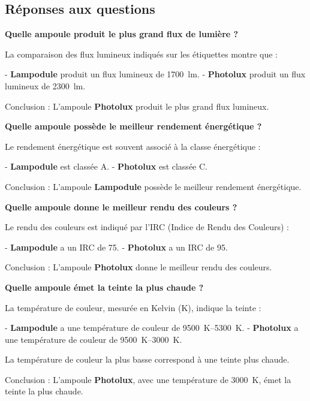 \documentclass[answers]{exam}
\begin{document}
    \begin{solution}
\subsection*{Réponses aux questions}

\begin{questions}

\item \textbf{Quelle ampoule produit le plus grand flux de lumière ?}

La comparaison des flux lumineux indiqués sur les étiquettes montre que :

- \textbf{Lampodule} produit un flux lumineux de \SI{1700}{lm}.
- \textbf{Photolux} produit un flux lumineux de \SI{2300}{lm}.

Conclusion : L'ampoule \textbf{Photolux} produit le plus grand flux lumineux.

\item \textbf{Quelle ampoule possède le meilleur rendement énergétique ?}

Le rendement énergétique est souvent associé à la classe énergétique :

- \textbf{Lampodule} est classée A.
- \textbf{Photolux} est classée C.

Conclusion : L'ampoule \textbf{Lampodule} possède le meilleur rendement énergétique.

\item \textbf{Quelle ampoule donne le meilleur rendu des couleurs ?}

Le rendu des couleurs est indiqué par l'IRC (Indice de Rendu des Couleurs) :

- \textbf{Lampodule} a un IRC de 75.
- \textbf{Photolux} a un IRC de 95.

Conclusion : L'ampoule \textbf{Photolux} donne le meilleur rendu des couleurs.

\item \textbf{Quelle ampoule émet la teinte la plus chaude ?}

La température de couleur, mesurée en Kelvin (K), indique la teinte :

- \textbf{Lampodule} a une température de couleur de \SIrange{9500}{5300}{K}.
- \textbf{Photolux} a une température de couleur de \SIrange{9500}{3000}{K}.

La température de couleur la plus basse correspond à une teinte plus chaude. 

Conclusion : L'ampoule \textbf{Photolux}, avec une température de \SI{3000}{K}, émet la teinte la plus chaude.

\end{questions}
\end{solution}
\end{document}
